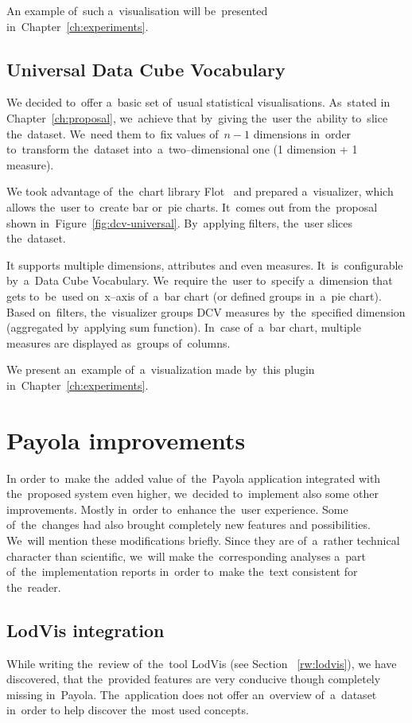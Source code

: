 An example of~such a~visualisation will be~presented in~Chapter~\ref{ch:experiments}.

\subsection{Universal Data Cube Vocabulary}
We decided to~offer a~basic set of~usual statistical visualisations. As~stated 
in Chapter~\ref{ch:proposal}, we~achieve that by~giving the~user the~ability to~slice the~dataset. We~need them to~fix values of~$n-1$ dimensions in~order to~transform the~dataset into~a~two--dimensional one (1 dimension + 1 measure).

We took advantage of~the~chart library Flot~\cite{flot} and prepared a~visualizer, which allows the~user to~create bar or~pie charts. It~comes out from the~proposal shown in~Figure~\ref{fig:dcv-universal}. By~applying filters, the~user slices the~dataset.

It supports multiple dimensions, attributes and even measures. It~is~configurable by~a~Data Cube Vocabulary. We~require the~user to~specify a~dimension that gets to~be~used on~x--axis of~a~bar chart (or defined groups in~a~pie chart). Based on~filters, the~visualizer groups DCV measures by~the~specified 
dimension (aggregated by~applying sum function). In~case of~a~bar chart, multiple measures are 
displayed as~groups of~columns.

We present an~example of~a~visualization made by~this plugin in~Chapter~\ref{ch:experiments}.

\section{Payola improvements}
In order to~make the~added value of~the~Payola application integrated with the~proposed system even higher, we~decided to~implement also some other
improvements. Mostly in~order to~enhance the~user experience. Some of~the~changes
had also brought completely new features and possibilities. We~will mention 
these modifications briefly. Since they are of~a~rather technical character 
than scientific, we~will make the~corresponding analyses a~part of~the~implementation reports in~order to~make the~text consistent for the~reader.

\subsection{LodVis integration}
While writing the~review of~the~tool LodVis (see Section ~\ref{rw:lodvis}), 
we have discovered, that the~provided features are very conducive though completely 
missing in~Payola. The~application does not offer an~overview of~a~dataset in~order 
to help discover the~most used concepts.

